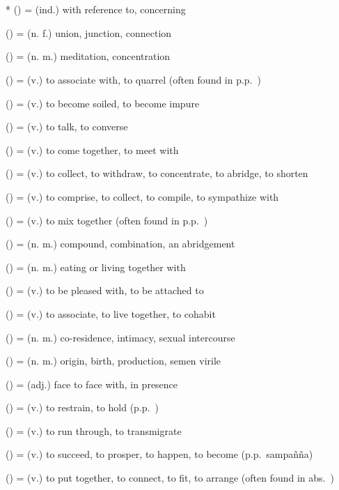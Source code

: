 \section*{}\label{upasagga:sadm}
\begin{compactitem}
\item {}* () = (ind.) with reference to, concerning
\item {} () = (n. f.) union, junction, connection
\item {} () = (n. m.) meditation, concentration
\item {} () = (v.) to associate with, to quarrel (often found in p.p.\ )
\item {} () = (v.) to become soiled, to become impure
\item {} () = (v.) to talk, to converse
\item {} () = (v.) to come together, to meet with
\item {} () = (v.) to collect, to withdraw, to concentrate, to abridge, to shorten
\item {} () = (v.) to comprise, to collect, to compile, to sympathize with
\item {} () = (v.) to mix together (often found in p.p.\ )
\item {} () = (n. m.) compound, combination, an abridgement
\item {} () = (n. m.) eating or living together with
\item {} () = (v.) to be pleased with, to be attached to
\item {} () = (v.) to associate, to live together, to cohabit
\item {} () = (n. m.) co-residence, intimacy, sexual intercourse
\item {} () = (n. m.) origin, birth, production, semen virile
\item {} () = (adj.) face to face with, in presence
\item {} () = (v.) to restrain, to hold (p.p.\ )
\item {} () = (v.) to run through, to transmigrate
\item {} () = (v.) to succeed, to prosper, to happen, to become (p.p.\ sampa\~n\~na)
\item {} () = (v.) to put together, to connect, to fit, to arrange (often found in abs.\ )
\end{compactitem}
